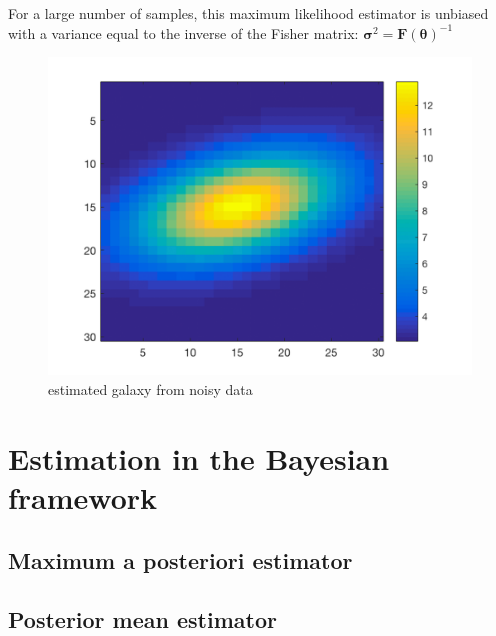 For a large number of samples, this maximum likelihood estimator is unbiased with a variance equal to the inverse of the Fisher matrix: $\boldsymbol{\sigma}^{2}=\boldsymbol{F}(\boldsymbol{\theta})^{-1}$


\begin{figure}[h!]
	\centering
	\includegraphics[width=\textwidth/2]{images/galaxy_MLE}
	\caption{estimated galaxy from noisy data}
	\label{fig:MLE}
\end{figure}



\section{Estimation in the Bayesian framework}

\subsection{Maximum a posteriori estimator}

\subsection{Posterior mean estimator}


